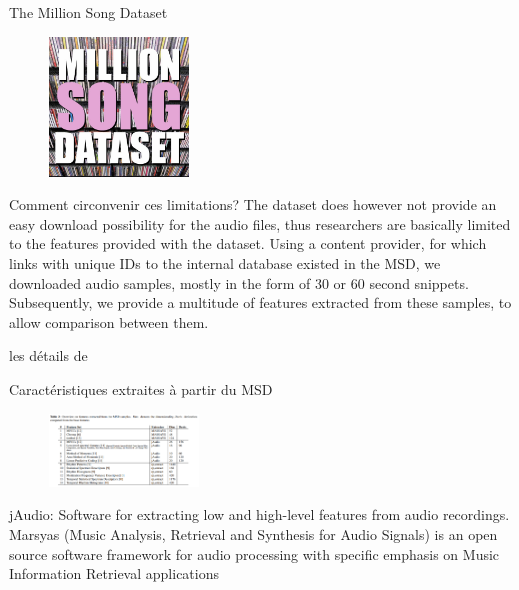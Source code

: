 \documentclass{beamer}
\begin{document}
\begin{frame}{The Million Song Dataset}
\begin{figure}
\centering
\includegraphics[width=140px]{images/millionsong2.jpg}
\end{figure}
%
%
\end{frame}

\begin{frame}{Comment circonvenir ces limitations?}
The dataset does however not provide an easy download possibility for the
audio files, thus researchers are basically limited to the features provided
with the dataset. Using a content provider, for which links with unique IDs to
the internal database existed in the MSD, we downloaded audio samples, mostly
in the form of 30 or 60 second snippets. Subsequently, we provide a multitude
of features extracted from these samples, to allow comparison between them.

les détails de 
\end{frame}

\begin{frame}{Caractéristiques extraites à partir du MSD}
    \begin{figure}
        \centering
        \includegraphics[width=150px]{images/overview_on_features_extracted_from_msd.png}
    \end{figure}
    jAudio: Software for extracting low and high-level features from audio
    recordings.
    Marsyas (Music Analysis, Retrieval and Synthesis for Audio Signals) is an
    open source software framework for audio processing with specific emphasis
    on Music Information Retrieval applications
\end{frame}
\end{document}

